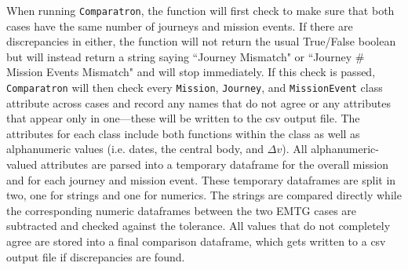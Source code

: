 When running \texttt{Comparatron}, the function will first check to make sure that both cases have the same number of journeys and mission events. If there are discrepancies in either, the function will not return the usual True/False boolean but will instead return a string saying ``Journey Mismatch" or ``Journey \# Mission Events Mismatch" and will stop immediately. If this check is passed, \texttt{Comparatron} will then check every \texttt{Mission}, \texttt{Journey}, and \texttt{MissionEvent} class attribute across cases and record any names that do not agree or any attributes that appear only in one---these will be written to the csv output file. The attributes for each class include both functions within the class as well as alphanumeric values (i.e. dates, the central body, and $\Delta v$). All alphanumeric-valued attributes are parsed into a temporary dataframe for the overall mission and for each journey and mission event. These temporary dataframes are split in two, one for strings and one for numerics. The strings are compared directly while the corresponding numeric dataframes between the two EMTG cases are subtracted and checked against the tolerance. All values that do not completely agree are stored into a final comparison dataframe, which gets written to a csv output file if discrepancies are found.